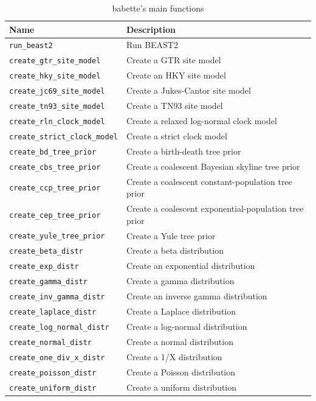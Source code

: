 \documentclass{article}
\begin{document}
\begin{table}[]
\centering
\begin{tabular}{ | l | l | }
\hline
\textbf{Name} & \textbf{Description} \\
\hline
\verb;run_beast2; & Run BEAST2 \\
\hline
\verb;create_gtr_site_model; & Create a GTR site model \\
\verb;create_hky_site_model; & Create an HKY site model \\
\verb;create_jc69_site_model; & Create a Jukes-Cantor site model \\
\verb;create_tn93_site_model; & Create a TN93 site model \\
\hline
\verb;create_rln_clock_model; & Create a relaxed log-normal clock model \\
\verb;create_strict_clock_model; & Create a strict clock model \\
\hline
\verb;create_bd_tree_prior; & Create a birth-death tree prior \\
\verb;create_cbs_tree_prior; & Create a coalescent Bayesian skyline tree prior \\
\verb;create_ccp_tree_prior; & Create a coalescent constant-population tree prior \\
\verb;create_cep_tree_prior; & Create a coalescent exponential-population tree prior \\
\verb;create_yule_tree_prior; & Create a Yule tree prior \\
\hline
\verb;create_beta_distr; & Create a beta distribution \\
\verb;create_exp_distr; & Create an exponential distribution \\
\verb;create_gamma_distr; & Create a gamma distribution \\
\verb;create_inv_gamma_distr; & Create an inverse gamma distribution \\
\verb;create_laplace_distr; & Create a Laplace distribution \\
\verb;create_log_normal_distr; & Create a log-normal distribution \\
\verb;create_normal_distr; & Create a normal distribution \\
\verb;create_one_div_x_distr; & Create a 1/X distribution \\
\verb;create_poisson_distr; & Create a Poisson distribution \\
\verb;create_uniform_distr; & Create a uniform distribution \\
\hline
\end{tabular}
\caption{babette's main functions}
\label{tab:functions}
\end{table}
\end{document}
